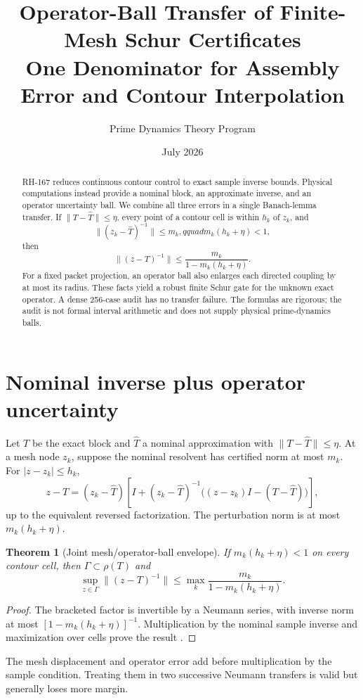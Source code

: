 \documentclass[12pt]{article}
\title{Operator-Ball Transfer of Finite-Mesh Schur Certificates\\\large One Denominator for Assembly Error and Contour Interpolation}
\author{Prime Dynamics Theory Program}
\date{July 2026}
\newtheorem{theorem}{Theorem}
\newcommand{\norm}[1]{\lVert#1\rVert}
\begin{document}
\maketitle
\begin{abstract}
RH-167 reduces continuous contour control to exact sample inverse bounds.
Physical computations instead provide a nominal block, an approximate
inverse, and an operator uncertainty ball.  We combine all three errors in a
single Banach-lemma transfer.  If $\norm{T-\widehat T}\le\eta$, every point
of a contour cell is within $h_k$ of $z_k$, and
\[
 \norm{(z_k-\widehat T)^{-1}}\le m_k,qquad
 m_k(h_k+\eta)<1,
\]
then
\[
 \norm{(z-T)^{-1}}\le
 \frac{m_k}{1-m_k(h_k+\eta)}.
\]
For a fixed packet projection, an operator ball also enlarges each directed
coupling by at most its radius.  These facts yield a robust finite Schur gate
for the unknown exact operator.  A dense 256-case audit has no transfer
failure.  The formulas are rigorous; the audit is not formal interval
arithmetic and does not supply physical prime-dynamics balls.
\end{abstract}

\section{Nominal inverse plus operator uncertainty}
Let $T$ be the exact block and $\widehat T$ a nominal approximation with
$\norm{T-\widehat T}\le\eta$.  At a mesh node $z_k$, suppose the nominal
resolvent has certified norm at most $m_k$.  For $|z-z_k|\le h_k$,
\[
 z-T=(z_k-\widehat T)
 \left[I+(z_k-\widehat T)^{-1}
 \bigl((z-z_k)I-(T-\widehat T)\bigr)\right],
\]
up to the equivalent reversed factorization.  The perturbation norm is at
most $m_k(h_k+\eta)$.

\begin{theorem}[Joint mesh/operator-ball envelope]\label{thm:joint}
If $m_k(h_k+\eta)<1$ on every contour cell, then $\Gamma\subset\rho(T)$ and
\[
 \sup_{z\in\Gamma}\norm{(z-T)^{-1}}
 \le\max_k\frac{m_k}{1-m_k(h_k+\eta)}.
\]
\end{theorem}
\begin{proof}
The bracketed factor is invertible by a Neumann series, with inverse norm at
most $[1-m_k(h_k+\eta)]^{-1}$.  Multiplication by the nominal sample inverse
and maximization over cells prove the result \citep{Kato1995}.
\end{proof}

The mesh displacement and operator error add before multiplication by the
sample condition.  Treating them in two successive Neumann transfers is
valid but generally loses more margin.
\end{document}

